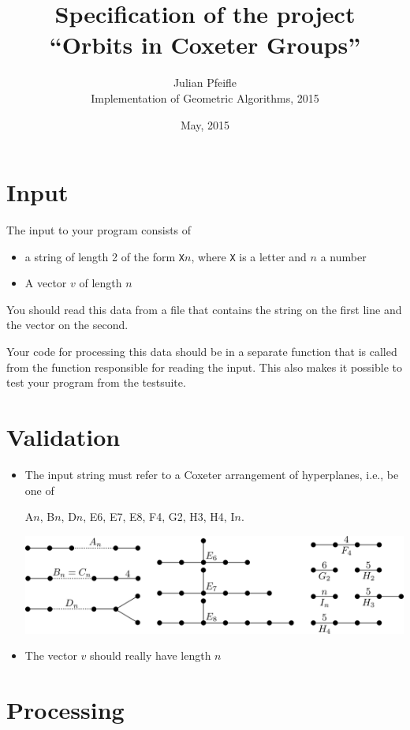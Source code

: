 \documentclass[11pt]{amsart}
\title{Specification of the project\\``Orbits in Coxeter Groups''}
\author{Julian Pfeifle\\ Implementation of Geometric Algorithms, 2015}
\date{May, 2015}
\begin{document}
\maketitle

\section{Input}

The input to your program consists of 
\begin{itemize}
\item a string of length 2 of the form {\tt X}$n$, where {\tt X} is a letter and $n$ a number
\item A vector $v$ of length $n$
\end{itemize}

You should read this data from a file that contains the string on the first line and the vector on the second.

Your code for processing this data should be in a separate function that is called from the function responsible for reading the input. This also makes it possible to test your program from the testsuite.


\section{Validation}

\begin{itemize}
\item The input string must refer to a Coxeter arrangement of hyperplanes, i.e., be one of
  \begin{center}
    \ttfamily A$n$, B$n$, D$n$, E6, E7, E8, F4, G2, H3, H4, I$n$.

    \bigskip
    \includegraphics[width=\linewidth]{finite-coxeter.png}
  \end{center}
\item The vector $v$ should really have length $n$
\end{itemize}


\section{Processing}
\end{document}

